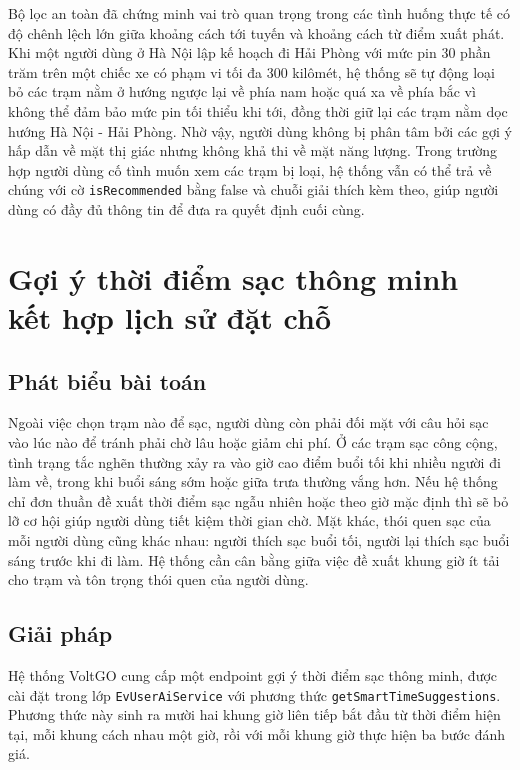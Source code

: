 \documentclass[../Main.tex]{subfiles}
\begin{document}
Bộ lọc an toàn đã chứng minh vai trò quan trọng trong các tình huống thực tế có độ chênh lệch lớn giữa khoảng cách tới tuyến và khoảng cách từ điểm xuất phát. Khi một người dùng ở Hà Nội lập kế hoạch đi Hải Phòng với mức pin 30 phần trăm trên một chiếc xe có phạm vi tối đa 300 kilômét, hệ thống sẽ tự động loại bỏ các trạm nằm ở hướng ngược lại về phía nam hoặc quá xa về phía bắc vì không thể đảm bảo mức pin tối thiểu khi tới, đồng thời giữ lại các trạm nằm dọc hướng Hà Nội - Hải Phòng. Nhờ vậy, người dùng không bị phân tâm bởi các gợi ý hấp dẫn về mặt thị giác nhưng không khả thi về mặt năng lượng. Trong trường hợp người dùng cố tình muốn xem các trạm bị loại, hệ thống vẫn có thể trả về chúng với cờ \texttt{isRecommended} bằng false và chuỗi giải thích kèm theo, giúp người dùng có đầy đủ thông tin để đưa ra quyết định cuối cùng.

\section{Gợi ý thời điểm sạc thông minh kết hợp lịch sử đặt chỗ}
\label{section:5.4}

\subsection{Phát biểu bài toán}

Ngoài việc chọn trạm nào để sạc, người dùng còn phải đối mặt với câu hỏi sạc vào lúc nào để tránh phải chờ lâu hoặc giảm chi phí. Ở các trạm sạc công cộng, tình trạng tắc nghẽn thường xảy ra vào giờ cao điểm buổi tối khi nhiều người đi làm về, trong khi buổi sáng sớm hoặc giữa trưa thường vắng hơn. Nếu hệ thống chỉ đơn thuần đề xuất thời điểm sạc ngẫu nhiên hoặc theo giờ mặc định thì sẽ bỏ lỡ cơ hội giúp người dùng tiết kiệm thời gian chờ. Mặt khác, thói quen sạc của mỗi người dùng cũng khác nhau: người thích sạc buổi tối, người lại thích sạc buổi sáng trước khi đi làm. Hệ thống cần cân bằng giữa việc đề xuất khung giờ ít tải cho trạm và tôn trọng thói quen của người dùng.

\subsection{Giải pháp}

Hệ thống VoltGO cung cấp một endpoint gợi ý thời điểm sạc thông minh, được cài đặt trong lớp \texttt{EvUserAiService} với phương thức \texttt{getSmartTimeSuggestions}. Phương thức này sinh ra mười hai khung giờ liên tiếp bắt đầu từ thời điểm hiện tại, mỗi khung cách nhau một giờ, rồi với mỗi khung giờ thực hiện ba bước đánh giá.
\end{document}
